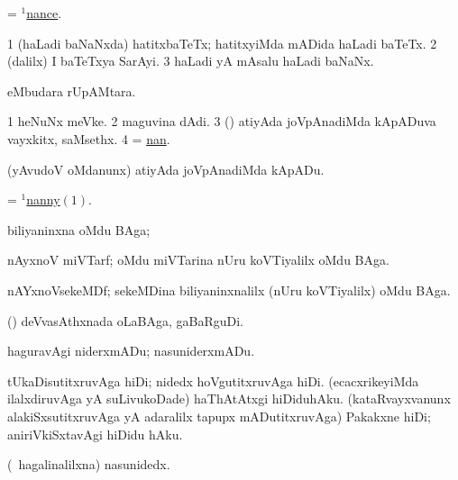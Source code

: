 \bentry
{}
\gl{\nA}
\bmng
= \hyperlink{nance(1)}{$^1$nance}.
\emng
\eentry

\bentry
{}
\gl{\nA}
\bmng
\bnum
\num{1} (haLadi baNaNxda) hatitxbaTeTx; hatitxyiMda mADida haLadi baTeTx. 
\num{2} (\bava dalilx) I baTeTxya SarAyi. 
\num{3} haLadi yA mAsalu haLadi baNaNx. 
\enum
\emng
\eentry

\bentry
{}
\gl{\nA}
\bmng
{} eMbudara rUpAMtara. 
\emng
\eentry

\bentry
{}
\gl{\nA}
\bmng
\bnum
\num{1} heNuNx meVke. 
\num{2} maguvina dAdi. 
\num{3} (\rUpa) atiyAda joVpAnadiMda kApADuva vayxkitx, saMsethx. 
\num{4} = \hyperlink{nan}{nan}.
\enum
\emng
\eentry

\bentry
{}
\gl{\sakirx}
\bmng
(yAvudoV oMdanunx) atiyAda joVpAnadiMda kApADu. 
\emng
\eentry

\bentry
{}
\gl{\nA}
\bmng
= \hyperlink{nanny(1)}{$^1$nanny\((1)\)}. 
\emng
\eentry

\bentry
{}
\bmng
biliyaninxna oMdu BAga;  
\emng
\eentry

\bentry
{}
\gl{\nA}
\bmng
nAyxnoV miVTarf; oMdu miVTarina nUru koVTiyalilx oMdu BAga. 
\emng
\eentry

\bentry
{}
\gl{\nA}
\bmng
nAYxnoVsekeMDf; sekeMDina biliyaninxnalilx (nUru koVTiyalilx) oMdu BAga. 
\emng
\eentry

\bentry
{}
\gl{\nA}
\bmng
 (\girxVca) deVvasAthxnada oLaBAga, gaBaRguDi. 
\emng
\eentry

\bentry
{}
\gl{\akirx}
\bmng
haguravAgi niderxmADu; nasuniderxmADu. 
\emng

\noindent
\gl{\pagu}
\bmng
{}  
\banum
{} tUkaDisutitxruvAga hiDi; nidedx hoVgutitxruvAga hiDi. 
 (ecacxrikeyiMda ilalxdiruvAga yA suLivukoDade) haThAtAtxgi hiDiduhAku. 
 (kataRvayxvanunx alakiSxsutitxruvAga yA adaralilx tapupx mADutitxruvAga) Pakakxne hiDi; aniriVkiSxtavAgi hiDidu hAku. 
\eanum
\emng
\eentry

\bentry
{}
\gl{\nA}
\bmng
(\kanmu\ hagalinalilxna) nasunidedx. 
\emng

